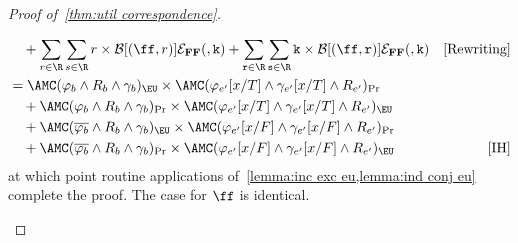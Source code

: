 \begin{proof}[Proof of~\cref{thm:util correspondence}]
\begin{itemize}[leftmargin=*]
\begin{align*}
      &\quad + 
        \sum_{r \in \R} \sum_{s \in \R} r \times 
          \mathcal B [(\ff,r)] \mathcal{E}_{\mathbf{FF}} (\tt, k)
        + \sum_{r \in \R} \sum_{s \in \R} k \times 
          \mathcal B [(\ff,r)] \mathcal{E}_{\mathbf{FF}} (\tt, k)
      &\text{[Rewriting]}\\
      &=\AMC(\varphi_b \land R_b \land \gamma_b)_{\EU} 
        \times \AMC(\varphi_{e'}[x/T] \land \gamma_{e'}[x/T] \land R_{e'})_{\Pr}
      &\\
      & \quad + \AMC(\varphi_b \land R_b \land \gamma_b)_{\Pr} 
        \times \AMC(\varphi_{e'}[x/T] \land \gamma_{e'}[x/T] \land R_{e'})_{\EU}
      &\\
      &\quad + \AMC(\overline{\varphi_b} \land R_b \land \gamma_b)_{\EU} 
        \times \AMC(\varphi_{e'}[x/F] \land \gamma_{e'}[x/F] \land R_{e'})_{\Pr}
      &\\
      & \quad + \AMC(\overline{\varphi_b} \land R_b \land \gamma_b)_{\Pr} 
        \times \AMC(\varphi_{e'}[x/F] \land \gamma_{e'}[x/F] \land R_{e'})_{\EU}
      &\text{[IH]}
  \end{align*}
  at which point routine applications of~\cref{lemma:inc exc eu,lemma:ind conj eu}
  complete the proof. The case for $\ff$ is identical.
  \end{itemize}

\end{proof}
